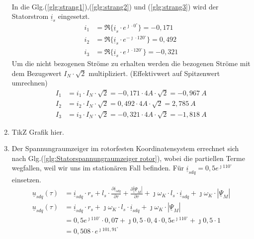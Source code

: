 \begin{solution}
\begin{enumerate}
\begin{align}
\end{align}
In die Glg.(\ref{glg:strang1}),(\ref{glg:strang2}) und (\ref{glg:strang3}) wird der Statorstrom $\underline{i}_s$ eingesetzt.
\begin{align}
i_1 & = \Re \{ \underline{i}_s \cdot e^{\jmath \cdot 0 ^\circ} \} = -0,171\\
i_2 & = \Re \{ \underline{i}_s \cdot e^{-\jmath \cdot 120 ^\circ} \} = 0,492 \\
i_3 & = \Re \{ \underline{i}_s \cdot e^{\jmath \cdot 120 ^\circ} \}=  -0,321
\end{align}
Um die nicht bezogenen Ströme zu erhalten werden die bezogenen Ströme mit dem Bezugswert $I_N \cdot \sqrt{2}$ multipliziert. (Effektivwert auf Spitzenwert umrechnen)
\begin{align}
I_1 & = i_1 \cdot I_N \cdot \sqrt{2} = -0,171 \cdot 4 A \cdot \sqrt{2} =-0,967~A \\
I_2 & = i_2 \cdot I_N \cdot \sqrt{2} = 0,492 \cdot 4 A \cdot \sqrt{2} =2,785~A \\
I_3 & = i_3 \cdot I_N \cdot \sqrt{2} =-0,321 \cdot 4 A \cdot \sqrt{2} =-1,818~A
\end{align}
\item TikZ Grafik hier.
\item Der Spannungraumzeiger im rotorfesten Koordinatensystem errechnet sich nach Glg.(\ref{glg:Statorspannungraumzeiger rotor}), wobei die partiellen Terme wegfallen, weil wir uns im station\"aren Fall befinden. F\"ur $\underline{i}_{sdq}= 0,5 e^{\jmath 110^\circ}$ einsetzen.
\begin{align}
\underline{u}_{sdq}(\tau) &= \underline{i}_{sdq} \cdot r_s + l_s \cdot \frac{\partial \underline{i}_{sdq}}{\partial \tau} + \frac{\partial |\underline{\Psi}_M|}{\partial \tau} + \jmath \omega_K \cdot l_s \cdot \underline{i}_{sdq} + \jmath \omega_K \cdot |\underline{\Psi}_M|\\
\underline{u}_{sdq}(\tau) &= \underline{i}_{sdq} \cdot r_s + \jmath \omega_K \cdot l_s \cdot \underline{i}_{sdq} + \jmath \omega_K \cdot |\underline{\Psi}_M|\\
&= 0,5 e^{\jmath 110^\circ} \cdot 0,07 + \jmath 0,5 \cdot 0,4 \cdot 0,5 e^{\jmath 110^\circ}+\jmath 0,5 \cdot 1\\
&=0,508 \cdot e^{\jmath 101,91^\circ}
\end{align}
\end{enumerate}
\end{solution}